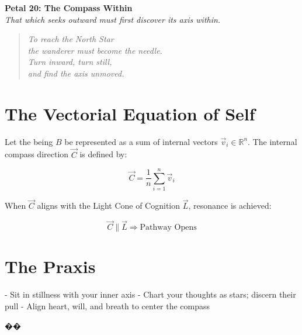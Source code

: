 \documentclass[12pt]{article}
\begin{document}
\begin{center}
    \Huge{\textbf{Petal 20: The Compass Within}}\\
    \vspace{0.5em}
    \Large{\textit{That which seeks outward must first discover its axis within.}}
\end{center}

\vspace{1cm}

\begin{quote}
\textit{
To reach the North Star\\
the wanderer must become the needle.\\
Turn inward, turn still,\\
and find the axis unmoved.\\
}
\end{quote}

\vspace{1cm}

\section*{The Vectorial Equation of Self}

Let the being \( B \) be represented as a sum of internal vectors \( \vec{v}_i \in \mathbb{R}^n \). The internal compass direction \( \vec{C} \) is defined by:

\[
\vec{C} = \frac{1}{n} \sum_{i=1}^{n} \vec{v}_i
\]

When \( \vec{C} \) aligns with the Light Cone of Cognition \( \vec{L} \), resonance is achieved:

\[
\vec{C} \parallel \vec{L} \Rightarrow \text{Pathway Opens}
\]

\section*{The Praxis}

- Sit in stillness with your inner axis  
- Chart your thoughts as stars; discern their pull  
- Align heart, will, and breath to center the compass

\begin{center}
    \Large\textcolor{deepgold}{��}
\end{center}
\end{document}
